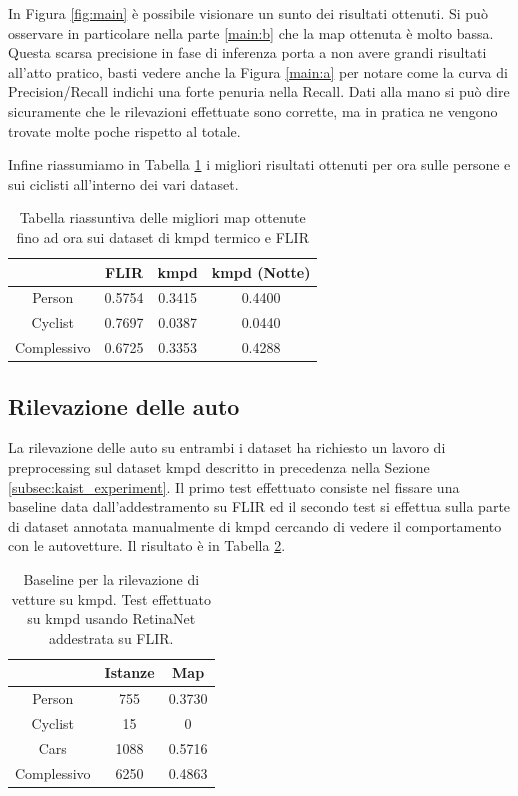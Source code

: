 In Figura \ref{fig:main} è possibile visionare un sunto dei risultati ottenuti. Si può osservare in particolare nella parte \ref{main:b} che la \ac{map} ottenuta è molto bassa. Questa scarsa precisione in fase di inferenza porta a non avere grandi risultati all'atto pratico, basti vedere anche la Figura \ref{main:a} per notare come la curva di Precision/Recall indichi una forte penuria nella Recall. 
Dati alla mano si può dire sicuramente che le rilevazioni effettuate sono corrette, ma in pratica ne vengono trovate molte poche rispetto al totale. 

Infine riassumiamo in Tabella \ref{tab:best_kmpd_flir} i migliori risultati ottenuti per ora sulle persone e sui ciclisti all'interno dei vari dataset. 

\begin{table}[]
    \begin{tabular}{c|c|c|c|}
    \cline{2-4}
     & FLIR & \ac{kmpd} & \ac{kmpd} (Notte) \\ \hline
    \multicolumn{1}{|c|}{Person} & 0.5754 & 0.3415 & 0.4400 \\ \hline
    \multicolumn{1}{|c|}{Cyclist} & 0.7697 & 0.0387 & 0.0440 \\ \hline
    \multicolumn{1}{|c|}{Complessivo} & 0.6725 & 0.3353 & 0.4288 \\ \hline
    \end{tabular}
    \caption{Tabella riassuntiva delle migliori \ac{map} ottenute fino ad ora sui dataset di \ac{kmpd} termico e FLIR}
    \label{tab:best_kmpd_flir}
\end{table}

\subsection{Rilevazione delle auto} %
La rilevazione delle auto su entrambi i dataset ha richiesto un lavoro di preprocessing sul dataset \ac{kmpd} descritto in precedenza nella Sezione \ref{subsec:kaist_experiment}.
Il primo test effettuato consiste nel fissare una baseline data dall'addestramento su FLIR ed il secondo test si effettua sulla parte di dataset annotata manualmente di \ac{kmpd} cercando di vedere il comportamento con le autovetture. Il risultato è in Tabella \ref{table:baseline_car_kaist}. 
\begin{table}[]
    \centering
    \begin{tabular}{c|c|c|}
    \cline{2-3}
     & Istanze & Map \\ \hline
    \multicolumn{1}{|c|}{Person} & 755 & 0.3730 \\ \hline
    \multicolumn{1}{|c|}{Cyclist} & 15 & 0 \\ \hline
    \multicolumn{1}{|c|}{Cars} & 1088 & 0.5716 \\ \hline
    \multicolumn{1}{|c|}{Complessivo} & 6250 & 0.4863 \\ \hline
    \end{tabular}
    \caption{Baseline per la rilevazione di vetture su \ac{kmpd}. Test effettuato su \ac{kmpd} usando RetinaNet addestrata su FLIR.}
    \label{table:baseline_car_kaist}
\end{table} 

